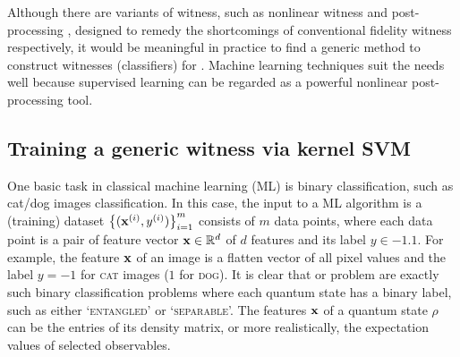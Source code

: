 \documentclass[
aps,
pra,
twocolumn,
floatfix,
]{revtex4-2}
\theoremstyle{plain}
\theoremstyle{definition}
\newcommand{\dm}{\rho}
\newcommand{\entangled}{\textsc{entangled}}
\newcommand{\separable}{\textsc{separable}}
\begin{document}
Although there are variants of witness, such as nonlinear witness \cite{guhneNonlinearEntanglementWitnesses2006} and post-processing \cite{zhanDetectingEntanglementUnfaithful2021}, designed to remedy the shortcomings of conventional fidelity witness respectively, 
it would be meaningful in practice to find a generic method to construct witnesses (classifiers) for .
Machine learning techniques suit the needs well because supervised learning can be regarded as a powerful nonlinear post-processing tool.


\subsection{Training a generic witness via kernel SVM}
One basic task in classical machine learning (ML) is binary classification,
such as cat/dog images classification. 
In this case, the input to a ML algorithm is a (training) dataset $\qty{(\vb{x}^{(i)},y^{(i)})}_{i=1}^m$ consists of $m$ data points, 
where each data point is a pair of feature vector $\vb{x}\in \mathbb{R}^d$ of $d$ features and its label $y\in\qty{-1,1}$.
For example, the feature $\vb{x}$ of an image is a flatten vector of all pixel values and the label $y=-1$ for \textsc{cat} images ($1$ for \textsc{dog}).
It is clear that  or  problem are exactly such binary classification problems where each quantum state has a binary label, such as either `\entangled' or `\separable'.
The features $\vb{x}$ of a quantum state $\dm$ can be the entries of its density matrix, or more realistically, the expectation values of selected observables.
\end{document}
